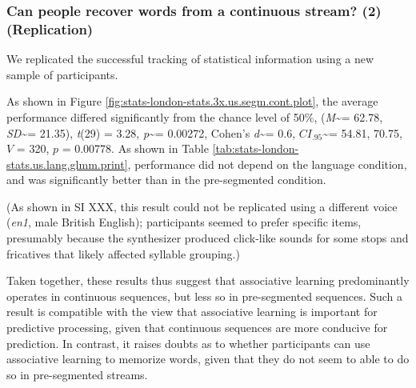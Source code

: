 \documentclass[
]{article}
\newcommand{\T}{{\em t\/}}
\newcommand{\p}{{\em p\/}}
\newcommand{\M}{{\em M\/}}
\newcommand{\SD}{{\em SD\/}}
\newcommand{\D}{Cohen's {\em d\/}}
\newcommand{\CI}{$CI_{.95}$}
\begin{document}
\subsubsection{Can people recover words from a continuous stream? (2)
(Replication)}\label{can-people-recover-words-from-a-continuous-stream-2-replication}

We replicated the successful tracking of statistical information using a
new sample of participants.

As shown in Figure \ref{fig:stats-london-stats.3x.us.segm.cont.plot},
the average performance differed significantly from the chance level of
50\%, (\M\textasciitilde= 62.78, \SD\textasciitilde= 21.35), \T(29) =
3.28, \p\textasciitilde= 0.00272, \D\textasciitilde= 0.6,
\CI\textasciitilde= 54.81, 70.75, \(V\) = 320, \(p\) = 0.00778. As shown
in Table \ref{tab:stats-london-stats.us.lang.glmm.print}, performance
did not depend on the language condition, and was significantly better
than in the pre-segmented condition.

(As shown in SI XXX, this result could not be replicated using a
different voice (\emph{en1}, male British English); participants seemed
to prefer specific items, presumably because the synthesizer produced
click-like sounds for some stops and fricatives that likely affected
syllable grouping.)

Taken together, these results thus suggest that associative learning
predominantly operates in continuous sequences, but less so in
pre-segmented sequences. Such a result is compatible with the view that
associative learning is important for predictive processing, given that
continuous sequences are more conducive for prediction. In contrast, it
raises doubts as to whether participants can use associative learning to
memorize words, given that they do not seem to able to do so in
pre-segmented streams.
\end{document}

